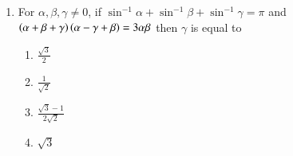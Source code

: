\documentclass[journal]{IEEEtran}
\begin{document}
\begin{enumerate}
\begin{multicols}{4}
\begin{enumerate}
        \item $\sqrt{86}$
        \item $\sqrt{20}$
        \item $\sqrt{54}$
        \item $\sqrt{74}$
    \end{enumerate}
\end{multicols}

    \item For $\alpha, \beta, \gamma \ne 0$, if $\sin^{-1}\alpha + \sin^{-1}\beta + \sin^{-1}\gamma = \pi$
        and $\left(\alpha+\beta+\gamma\right)\left(\alpha-\gamma+\beta\right) = 3\alpha\beta$ then $\gamma$ is
    equal to

    \begin{multicols}{4}
\begin{enumerate}

        \item $\frac{\sqrt{3}}{2}$
        \item $\frac{1}{\sqrt{2}}$
        \item $\frac{\sqrt{3} - 1}{2\sqrt{2}}$
        \item $\sqrt{3}$
    \end{enumerate}
\end{multicols}
\end{enumerate}
\end{document}
